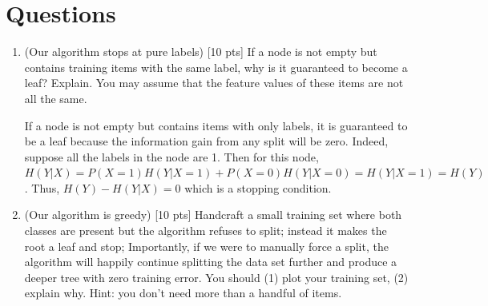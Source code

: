 \documentclass[a4paper]{article}
\theoremstyle{definition}
\newenvironment{soln}{
    \leavevmode\color{blue}\ignorespaces
}{}
\begin{document}
\section{Questions}
\begin{enumerate}
\item (Our algorithm stops at pure labels) [10 pts] If a node is not empty but contains training items with the same label, why is it guaranteed to become a leaf?  Explain. You may assume that the feature values of these items are not all the same. \\

\begin{soln}
  If a node is not empty but contains items with only labels, it is guaranteed to be a leaf because the information gain from any split will be zero.
  Indeed, suppose all the labels in the node are 1.
  Then for this node, $H(Y \vert X) = P(X = 1)H(Y \vert X=1) + P(X = 0)H(Y \vert X=0) = H(Y \vert X=1) = H(Y)$.
  Thus, $H(Y) - H(Y \vert X) = 0$ which is a stopping condition.
\end{soln}

\item (Our algorithm is greedy)  [10 pts] Handcraft a small training set where both classes are present but the algorithm refuses to split; instead it makes the root a leaf and stop;
Importantly, if we were to manually force a split, the algorithm will happily continue splitting the data set further and produce a deeper tree with zero training error.
You should (1) plot your training set, (2) explain why.  Hint: you don't need more than a handful of items. \\


\end{enumerate}
\end{document}
